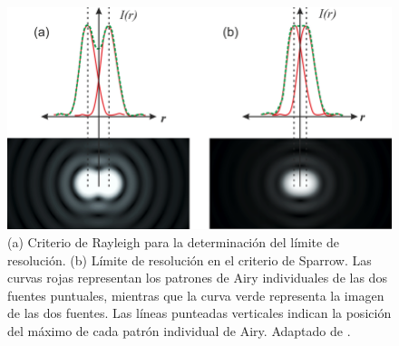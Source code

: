 \begin{figure}[H]
	\centering
	\includegraphics[width=1.0\textwidth]{Figs/microespectrometro/raylspa.png}
	\caption{(a) Criterio de Rayleigh para la determinación del límite de resolución. (b) Límite de resolución en el criterio de Sparrow. Las curvas rojas representan los patrones de Airy individuales de las dos fuentes puntuales, mientras que la curva verde representa la imagen de las dos fuentes. Las líneas punteadas verticales indican la posición del máximo de cada patrón individual de Airy. Adaptado de \cite{raylsp}.}
	\label{fig:critrayspa}
\end{figure}

